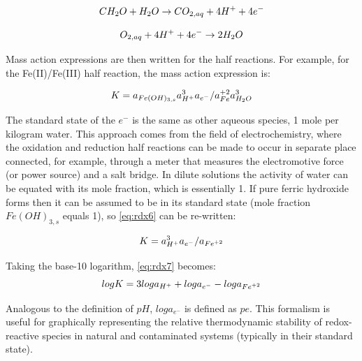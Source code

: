 \begin{equation}
CH_2O + H_2O \rightarrow CO_{2,aq} + 4H^+ + 4e^-  \\                    
\label{eq:om_half_reac}
\end{equation}

\begin{equation}
O_{2,aq} + 4H^+ + 4e^-  \rightarrow 2H_2O \\
\label{eq:ox_half_reac}
\end{equation}

Mass action expressions are then written for the half reactions.
For example, for the Fe(II)/Fe(III) half reaction, 
the mass action expression is:

\begin{equation}
K = a_{Fe(OH)_{3,s}} a_{H^+}^3 a_{e^-}/a_{Fe}^{+2} a_{H_2O}^3 \\
\label{eq:rdx5}
\end{equation}

The standard state of the $e^-$ is the same as other aqueous species,
1 mole per kilogram water.  
This approach comes from the field of electrochemistry, where the oxidation and 
reduction half reactions can be made to occur in separate place
connected, for example, 
through a meter that measures the electromotive force (or power source) 
and a salt bridge.
In dilute solutions the activity of water can be equated with its mole fraction,
which is essentially 1. If pure ferric hydroxide forms then it 
can be assumed to be in 
its standard state (mole fraction $Fe(OH)_{3,s}$
equals 1), 
so \ref{eq:rdx6} can be re-written:

\begin{equation}
K=a_{H^+}^3 a_{e^-}/a_{{Fe}^{+2}} \\    
\label{eq:rdx7}
\end{equation}
                                                         
Taking the base-10 logarithm, \ref{eq:rdx7} becomes: 
\begin{equation}
logK = 3loga_{H^+} + loga_{e^-} -loga_{{Fe}^{+2}}  \\                          
\label{eq:rdx8}
\end{equation}

Analogous to the definition of $pH$,
$loga_{e^-}$
is defined as $pe$.
This formalism is useful for graphically representing the 
relative thermodynamic stability of redox-reactive species 
in natural and contaminated systems 
(typically in their standard state).

